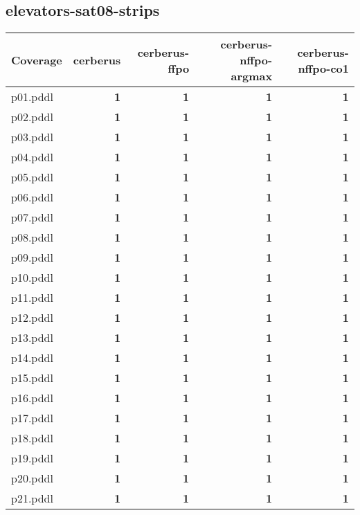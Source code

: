 \documentclass{article}
\begin{document}
\hypertarget{coverage-elevators-sat08-strips}{}
\subsection*{elevators-sat08-strips}

\begin{tabular}{@{}lrrrr@{}}
Coverage & cerberus & cerberus-ffpo & cerberus-nffpo-argmax & cerberus-nffpo-co1 \\
\midrule
p01.pddl & \textbf{1} & \textbf{1} & \textbf{1} & \textbf{1} \\
p02.pddl & \textbf{1} & \textbf{1} & \textbf{1} & \textbf{1} \\
p03.pddl & \textbf{1} & \textbf{1} & \textbf{1} & \textbf{1} \\
p04.pddl & \textbf{1} & \textbf{1} & \textbf{1} & \textbf{1} \\
p05.pddl & \textbf{1} & \textbf{1} & \textbf{1} & \textbf{1} \\
p06.pddl & \textbf{1} & \textbf{1} & \textbf{1} & \textbf{1} \\
p07.pddl & \textbf{1} & \textbf{1} & \textbf{1} & \textbf{1} \\
p08.pddl & \textbf{1} & \textbf{1} & \textbf{1} & \textbf{1} \\
p09.pddl & \textbf{1} & \textbf{1} & \textbf{1} & \textbf{1} \\
p10.pddl & \textbf{1} & \textbf{1} & \textbf{1} & \textbf{1} \\
p11.pddl & \textbf{1} & \textbf{1} & \textbf{1} & \textbf{1} \\
p12.pddl & \textbf{1} & \textbf{1} & \textbf{1} & \textbf{1} \\
p13.pddl & \textbf{1} & \textbf{1} & \textbf{1} & \textbf{1} \\
p14.pddl & \textbf{1} & \textbf{1} & \textbf{1} & \textbf{1} \\
p15.pddl & \textbf{1} & \textbf{1} & \textbf{1} & \textbf{1} \\
p16.pddl & \textbf{1} & \textbf{1} & \textbf{1} & \textbf{1} \\
p17.pddl & \textbf{1} & \textbf{1} & \textbf{1} & \textbf{1} \\
p18.pddl & \textbf{1} & \textbf{1} & \textbf{1} & \textbf{1} \\
p19.pddl & \textbf{1} & \textbf{1} & \textbf{1} & \textbf{1} \\
p20.pddl & \textbf{1} & \textbf{1} & \textbf{1} & \textbf{1} \\
p21.pddl & \textbf{1} & \textbf{1} & \textbf{1} & \textbf{1} \\

\end{tabular}
\end{document}
